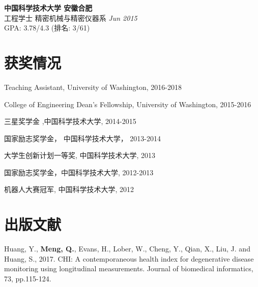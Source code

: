 \documentclass[margin,line,11pt]{resume}
\begin{document}
\begin{resume}
 \textbf{中国科学技术大学 \hfill 安徽合肥}\\
工程学士 \quad 精密机械与精密仪器系 \hfill \textit{Jun 2015}\\
 GPA: 3.78/4.3 (排名: 3/61)
           

 
     


                \vspace{-0.5em}\section{\mysidestyle 获奖情况}
        \begin{list2}
        \item {Teaching Assistant, University of Washington, 2016-2018}
                \item {College of Engineering Dean's Fellowship, University of Washington, 2015-2016}          
        \item {三星奖学金 ,中国科学技术大学, 2014-2015}
        \item {国家励志奖学金， 中国科学技术大学，  2013-2014}
        \item {大学生创新计划一等奖, 中国科学技术大学, 2013}          
        \item {国家励志奖学金，中国科学技术大学, 2012-2013}          
        \item {机器人大赛冠军, 中国科学技术大学, 2012}
        \end{list2}

                \vspace{-0.5em}\section{\mysidestyle 出版文献}
        Huang, Y., \textbf{Meng, Q.}, Evans, H., Lober, W., Cheng, Y., Qian, X., Liu, J. and Huang, S., 2017. CHI: A contemporaneous health index for degenerative disease monitoring using longitudinal measurements. Journal of biomedical informatics, 73, pp.115-124.


\end{resume}
\end{document}
